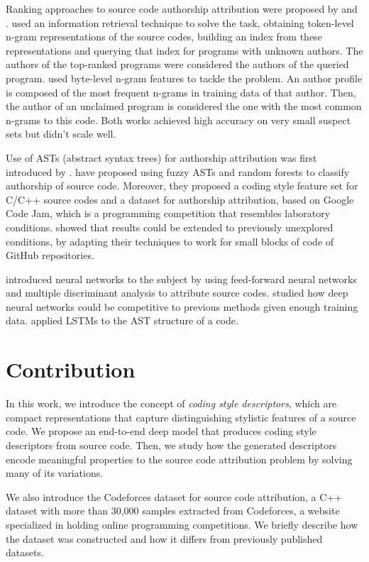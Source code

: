Ranking approaches to source code authorship attribution were proposed by  and .  used an information retrieval technique to solve the task, obtaining token-level n-gram representations of the source codes, building an index from these representations and querying that index for programs with unknown authors. The authors of the top-ranked programs were considered the authors of the queried program.  used byte-level n-gram features to tackle the problem. An author profile is composed of the most frequent n-grams in training data of that author. Then, the author of an unclaimed program is considered the one with the most common n-grams to this code. Both works achieved high accuracy on very small suspect sets but didn't scale well.

Use of ASTs (abstract syntax trees) for authorship attribution was first introduced by .  have proposed using fuzzy ASTs and random forests to classify authorship of source code. Moreover, they proposed a coding style feature set for C/C++ source codes and a dataset for authorship attribution, based on Google Code Jam, which is a programming competition that resembles laboratory conditions.  showed that  results could be extended to previously unexplored conditions, by adapting their techniques to work for small blocks of code of GitHub repositories.

 introduced neural networks to the subject by using feed-forward neural networks and multiple discriminant analysis to attribute source codes.  studied how deep neural networks could be competitive to previous methods given enough training data.  applied LSTMs to the AST structure of a code.

\section{Contribution}

In this work, we introduce the concept of \textit{coding style descriptors}, which are compact representations that capture distinguishing stylistic features of a source code. We propose an end-to-end deep model that produces coding style descriptors from source code. Then, we study how the generated descriptors encode meaningful properties to the source code attribution problem by solving many of its variations.

We also introduce the Codeforces dataset for source code attribution, a C++ dataset with more than 30,000 samples extracted from Codeforces, a website specialized in holding online programming competitions. We briefly describe how the dataset was constructed and how it differs from previously published datasets.

